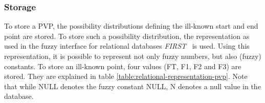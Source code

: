 



%  

\subsubsection{Storage}
\label{subsec:storage}
To store a PVP, the possibility distributions defining the ill-known start and end point are stored. To store such a possibility distribution, the representation as used in the fuzzy interface for relational databases \emph{FIRST}~\cite{Medina94gefred.a,Gal98} is used. Using this representation, it is possible to represent not only fuzzy numbers, but also (fuzzy) constants. To store an ill-known point, four values (FT, F1, F2 and F3) are stored. They are explained in table \ref{table:relational-representation-pvp}. Note that while NULL denotes the fuzzy constant NULL, N denotes a null value in the database.

%

